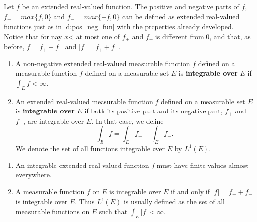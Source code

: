 \begin{rmk}%
	Let $f$ be an extended real-valued function. The positive and negative parts of 
	$f$, $f_+ = max\{f, 0\}$ and $f_- = max\{-f, 0\}$ can be defined as extended 
	real-valued functions just as in \ref{d:pos_neg_fun} with the properties already 
	developed. Notice that for nay $x$< at most one of $f_+$ and $f_-$ is different 
	from 0, and that, as before, $f = f_+ - f_-$ and $|f| = f_+ + f_-$. 
\end{rmk}


\begin{defn} %
	\begin{enumerate}
	\item A non-negative extended real-valued measurable function $f$ defined on a 
	measurable function $f$ defined on a measurable set $E$ is \textbf{integrable over} 
	$E$ if $\int_Ef<\infty$. 
	\item An extended real-valued measurable function $f$ defined on a measurable 
	set $E$ is \textbf{integrable over} $E$ if both its positive part and its 
	negative part, $f_+$ and $f_-$, are integrable over $E$. In that case, we define 
	\begin{equation*}
		\int_E f = \int_Ef_+-\int_Ef_-.
	\end{equation*}
	We denote the set of all functions integrable over $E$ by $L^1(E)$. 
	\end{enumerate}
\end{defn}

\begin{rmk}%
\begin{enumerate}
	\item An integrable extended real-valued function $f$ must have finite values 
	almost everywhere. 
	\item A measurable function $f$ on $E$ is integrable over $E$ if and only if 
	$|f| = f_++f_-$ is integrable over $E$. Thus $L^1(E)$ is usually defined as the 
	set of all measurable functions on $E$ such that $\int_E|f|<\infty$. 
\end{enumerate}
\end{rmk}

